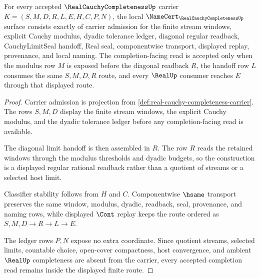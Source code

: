 \begin{theorem}
\label{thm:real-cauchy-completeness-namecert-obligations}
For every accepted $\RealCauchyCompletenessUp$ carrier $K=(S,M,D,R,L,E,H,C,P,N)$, the local $\NameCert_{\RealCauchyCompletenessUp}$ surface consists exactly of carrier admission for the finite stream windows, explicit Cauchy modulus, dyadic tolerance ledger, diagonal regular readback, CauchyLimitSeal handoff, Real seal, componentwise transport, displayed replay, provenance, and local naming. The completion-facing read is accepted only when the modulus row $M$ is exposed before the diagonal readback $R$, the handoff row $L$ consumes the same $S,M,D,R$ route, and every $\RealUp$ consumer reaches $E$ through that displayed route.
\end{theorem}
\begin{proof}
Carrier admission is projection from \autoref{def:real-cauchy-completeness-carrier}. The rows $S,M,D$ display the finite stream windows, the explicit Cauchy modulus, and the dyadic tolerance ledger before any completion-facing read is available.

The diagonal limit handoff is then assembled in $R$. The row $R$ reads the retained windows through the modulus thresholds and dyadic budgets, so the construction is a displayed regular rational readback rather than a quotient of streams or a selected host limit.

Classifier stability follows from $H$ and $C$. Componentwise $\hsame$ transport preserves the same window, modulus, dyadic, readback, seal, provenance, and naming rows, while displayed $\Cont$ replay keeps the route ordered as $S,M,D \to R \to L \to E$.

The ledger rows $P,N$ expose no extra coordinate. Since quotient streams, selected limits, countable choice, open-cover compactness, host convergence, and ambient $\RealUp$ completeness are absent from the carrier, every accepted completion read remains inside the displayed finite route.
\end{proof}

